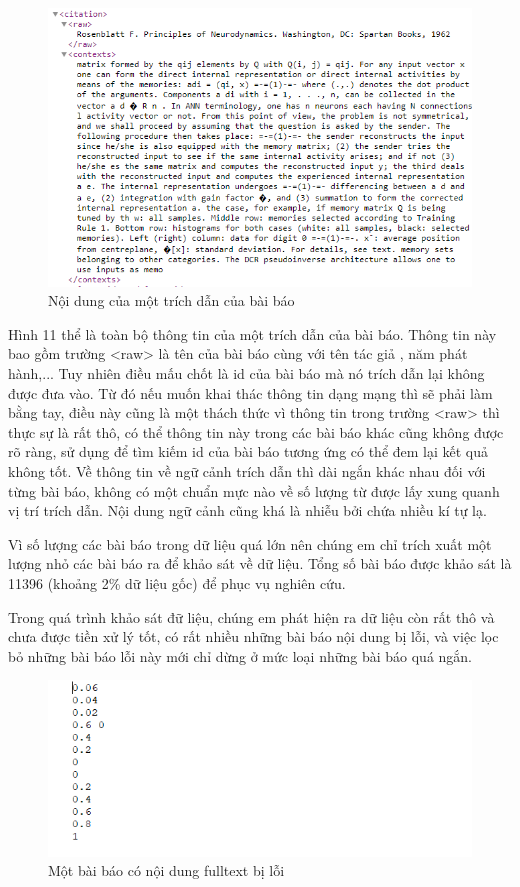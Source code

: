\documentclass[12pt,a4paper]{article}
\begin{document}
\begin{figure}[h]
    \centering
    \includegraphics[width=1.\textwidth]{citation}
    \caption{Nội dung của một trích dẫn của bài báo}
    \label{fig:title_paper}
\end{figure}


Hình 11 thể là toàn bộ thông tin của một trích dẫn của bài báo. Thông tin này bao gồm trường <raw> là tên của bài báo cùng với tên tác giả , năm phát hành,... Tuy nhiên điều mấu chốt là id của bài báo mà nó trích dẫn lại không được đưa vào. Từ đó nếu muốn khai thác thông tin dạng mạng thì sẽ phải làm bằng tay, điều này cũng là một thách thức vì thông tin trong trường <raw> thì thực sự là rất thô, có thể thông tin này trong các bài báo khác cũng không được rõ ràng, sử dụng để tìm kiếm id của bài báo tương ứng có thể đem lại kết quả không tốt. Về thông tin về ngữ cảnh trích dẫn thì dài ngắn khác nhau đối với từng bài báo, không có một chuẩn mực nào về số lượng từ được lấy xung quanh vị trí trích dẫn. Nội dung ngữ cảnh cũng khá là nhiễu bởi chứa nhiều kí tự lạ.


\noindent
Vì số lượng các bài báo trong dữ liệu quá lớn nên chúng em chỉ trích xuất một lượng nhỏ các bài báo ra để khảo sát về dữ liệu. Tổng số bài báo được khảo sát là 11396 (khoảng 2\% dữ liệu gốc) để phục vụ nghiên cứu.


Trong quá trình khảo sát đữ liệu, chúng em phát hiện ra dữ liệu còn rất thô và chưa được tiền xử lý tốt, có rất nhiều những bài báo nội dung bị lỗi, và việc lọc bỏ những bài báo lỗi này mới chỉ dừng ở mức loại những bài báo quá ngắn. 


\begin{figure}[h]
    \centering
    \includegraphics[width=1.\textwidth]{wrong}
    \caption{Một bài báo có nội dung fulltext bị lỗi}
    \label{fig:wrong_paper}
\end{figure}
\end{document}
